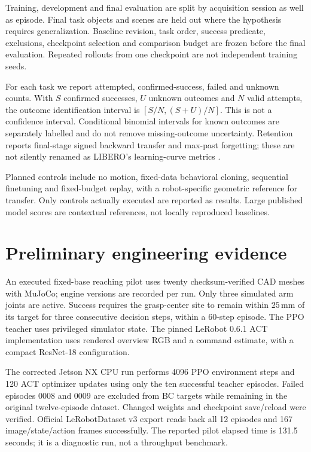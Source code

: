 \documentclass[conference]{IEEEtran}
\begin{document}
Training, development and final evaluation are split by acquisition session as well as episode. Final task objects and scenes are held out where the hypothesis requires generalization. Baseline revision, task order, success predicate, exclusions, checkpoint selection and comparison budget are frozen before the final evaluation. Repeated rollouts from one checkpoint are not independent training seeds.

For each task we report attempted, confirmed-success, failed and unknown counts. With $S$ confirmed successes, $U$ unknown outcomes and $N$ valid attempts, the outcome identification interval is $[S/N,(S+U)/N]$. This is not a confidence interval. Conditional binomial intervals for known outcomes are separately labelled and do not remove missing-outcome uncertainty. Retention reports final-stage signed backward transfer and max-past forgetting; these are not silently renamed as LIBERO's learning-curve metrics \citep{libero}.

Planned controls include no motion, fixed-data behavioral cloning, sequential finetuning and fixed-budget replay, with a robot-specific geometric reference for transfer. Only controls actually executed are reported as results. Large published model scores are contextual references, not locally reproduced baselines.

\section{Preliminary engineering evidence}
An executed fixed-base reaching pilot uses twenty checksum-verified CAD meshes with MuJoCo; engine versions are recorded per run. Only three simulated arm joints are active. Success requires the grasp-center site to remain within $25\,\mathrm{mm}$ of its target for three consecutive decision steps, within a 60-step episode. The PPO teacher uses privileged simulator state. The pinned LeRobot 0.6.1 ACT implementation uses rendered overview RGB and a command estimate, with a compact ResNet-18 configuration.

The corrected Jetson NX CPU run performs 4096 PPO environment steps and 120 ACT optimizer updates using only the ten successful teacher episodes. Failed episodes 0008 and 0009 are excluded from BC targets while remaining in the original twelve-episode dataset. Changed weights and checkpoint save/reload were verified. Official LeRobotDataset v3 export reads back all 12 episodes and 167 image/state/action frames successfully. The reported pilot elapsed time is 131.5 seconds; it is a diagnostic run, not a throughput benchmark.
\end{document}
